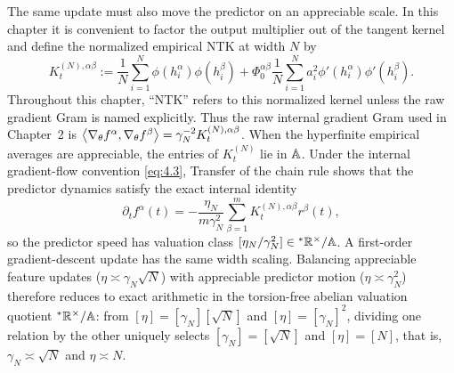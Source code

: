 The same update must also move the predictor on an appreciable scale. In this chapter it is convenient to factor the output multiplier out of the tangent kernel and define the normalized empirical NTK at width $N$ by
\begin{equation}\label{eq:4.12}
K_t^{(N),\alpha\beta} := \frac{1}{N}\sum_{i=1}^N \phi(h_i^\alpha)\phi(h_i^\beta) + \Phi_0^{\alpha\beta}\frac{1}{N}\sum_{i=1}^N a_i^2 \phi'(h_i^\alpha)\phi'(h_i^\beta).
\end{equation}
Throughout this chapter, ``NTK'' refers to this normalized kernel unless the raw gradient Gram is named explicitly. Thus the raw internal gradient Gram used in Chapter~2 is $\left\langle \nabla_\theta f^\alpha, \nabla_\theta f^\beta \right\rangle = \gamma_N^{-2} K_t^{(N),\alpha\beta}$. When the hyperfinite empirical averages are appreciable, the entries of $K_t^{(N)}$ lie in $\mathbb{A}$. Under the internal gradient-flow convention \eqref{eq:4.3}, Transfer of the chain rule shows that the predictor dynamics satisfy the exact internal identity
\begin{equation}\label{eq:4.13}
\partial_t f^\alpha(t) = -\frac{\eta_N}{m\gamma_N^2}\sum_{\beta=1}^m K_t^{(N),\alpha\beta} r^\beta(t),
\end{equation}
so the predictor speed has valuation class $[\eta_N / \gamma_N^2] \in {}^*\mathbb{R}^\times / \mathbb{A}$. A first-order gradient-descent update has the same width scaling. Balancing appreciable feature updates ($\eta \asymp \gamma_N\sqrt{N}$) with appreciable predictor motion ($\eta \asymp \gamma_N^2$) therefore reduces to exact arithmetic in the torsion-free abelian valuation quotient ${}^*\mathbb{R}^\times / \mathbb{A}$: from $[\eta] = [\gamma_N][\sqrt{N}]$ and $[\eta] = [\gamma_N]^2$, dividing one relation by the other uniquely selects $[\gamma_N] = [\sqrt{N}]$ and $[\eta] = [N]$, that is, $\gamma_N \asymp \sqrt{N}$ and $\eta \asymp N$.

